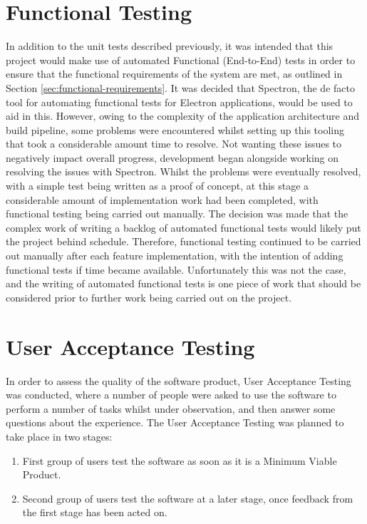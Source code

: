 \section{Functional Testing}
In addition to the unit tests described previously, it was intended that this project would make use of automated Functional (End-to-End) tests in order to ensure that the functional requirements of the system are met, as outlined in Section \ref{sec:functional-requirements}. It was decided that Spectron, the de facto tool for automating functional tests for Electron applications, would be used to aid in this. However, owing to the complexity of the application architecture and build pipeline, some problems were encountered whilst setting up this tooling that took a considerable amount time to resolve. Not wanting these issues to negatively impact overall progress, development began alongside working on resolving the issues with Spectron. Whilst the problems were eventually resolved, with a simple test being written as a proof of concept, at this stage a considerable amount of implementation work had been completed, with functional testing being carried out manually. The decision was made that the complex work of writing a backlog of automated functional tests would likely put the project behind schedule. Therefore, functional testing continued to be carried out manually after each feature implementation, with the intention of adding functional tests if time became available. Unfortunately this was not the case, and the writing of automated functional tests is one piece of work that should be considered prior to further work being carried out on the project.


\section{User Acceptance Testing}
In order to assess the quality of the software product, User Acceptance Testing was conducted, where a number of people were asked to use the software to perform a number of tasks whilst under observation, and then answer some questions about the experience. The User Acceptance Testing was planned to take place in two stages:

\begin{enumerate}
  \item First group of users test the software as soon as it is a Minimum Viable Product.
  \item Second group of users test the software at a later stage, once feedback from the first stage has been acted on.
\end{enumerate}

